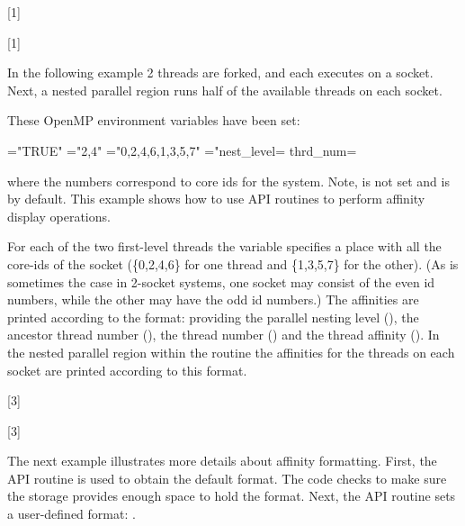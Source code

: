 [1]

[1]


In the following example 2 threads are forked, and each executes on a socket. Next,
a nested parallel region runs half of the available threads on each socket.

These OpenMP environment variables have been set:

\begin{boxeducode}
="TRUE"
="2,4"
="{0,2,4,6},{1,3,5,7}"
="nest_level= %
thrd_num= %
\end{boxeducode}

where the numbers correspond to core ids for the system. Note,  is not
set and is  by default.  This example shows how to use API routines to
perform affinity display operations.

For each of the two first-level threads the  variable specifies
a place with all the core-ids of the socket (\{0,2,4,6\} for one thread and \{1,3,5,7\} for the other).
(As is sometimes the case in 2-socket systems, one socket may consist
of the even id numbers, while the other may have the odd id numbers.)  The affinities
are printed according to the  format: providing
the parallel nesting level (), the ancestor thread number (), the thread number ()
and the thread affinity (). In the nested parallel region within the  routine
the affinities for the threads on each socket are printed according to this format.

[3]

[3]

{}
The next example illustrates more details about affinity formatting.
First, the  API routine is used to 
obtain the default format. The code checks to make sure the storage 
provides enough space to hold the format.  
Next, the  API routine sets a user-defined 
format: .   

